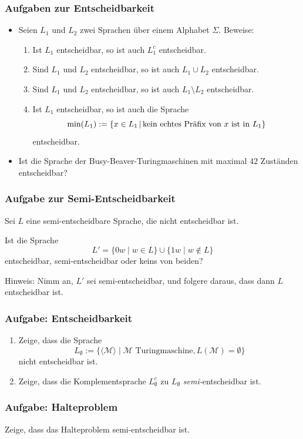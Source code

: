 \begin{frame}
\frametitle{Aufgaben zur Entscheidbarkeit}
\begin{itemize}
\item Seien $L_1$ und $L_2$ zwei Sprachen über einem Alphabet $\Sigma$.
Beweise:
\begin{enumerate}
\item Ist $L_1$ entscheidbar, so ist auch $L_1^c$ entscheidbar.
\item Sind $L_1$ und $L_2$ entscheidbar, so ist auch $L_1\cup L_2$ entscheidbar.
\item Sind $L_1$ und $L_2$ entscheidbar, so ist auch $L_1\setminus L_2$ entscheidbar.
\item Ist $L_1$ entscheidbar, so ist auch die Sprache 
$$\min(L_1):=\left\lbrace x\in L_1 \,\middle\vert\, \text{kein echtes Präfix von $x$ ist in }L_1 \right\rbrace$$
entscheidbar.
\end{enumerate}
\item Ist die Sprache der Busy-Beaver-Turingmaschinen mit maximal 42 Zuständen entscheidbar?
\end{itemize}
\end{frame}

\begin{frame}
 \frametitle{Aufgabe zur Semi-Entscheidbarkeit}
Sei $L$ eine semi-entscheidbare Sprache, die nicht entscheidbar ist.

Ist die
Sprache $$L'=\{0w \mid w \in L\} \cup \{1w \mid w \not\in L\}$$ entscheidbar,
semi-entscheidbar oder keins von beiden?

\ducttape{1cm}

Hinweis: Nimm an, $L'$ sei semi-entscheidbar, und folgere daraus, dass
dann $L$ entscheidbar ist. 
\end{frame}

\begin{frame}
   \frametitle{Aufgabe: Entscheidbarkeit}
	\begin{enumerate}
\item Zeige, dass die Sprache $$L_{\emptyset} := \{\langle \mathcal M \rangle \mid \mathcal M \text{ Turingmaschine}, L(\mathcal M) = \emptyset\}$$ nicht entscheidbar ist.
\item Zeige, dass die Komplementsprache $L_{\emptyset}^c$ zu $L_{\emptyset}$ \emph{semi-}entscheidbar ist.
\end{enumerate}
\end{frame}


\begin{frame}
 \frametitle{Aufgabe: Halteproblem}
 Zeige, dass das Halteproblem semi-entscheidbar ist.
\end{frame}

